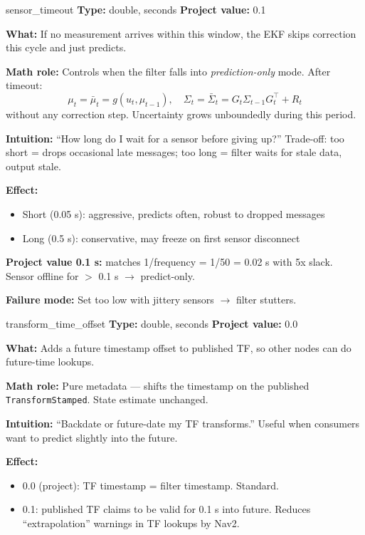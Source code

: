 \documentclass[11pt,a4paper]{article}
\begin{document}
\begin{paramcard}{sensor\_timeout}
\textbf{Type:} double, seconds \quad \textbf{Project value:} 0.1

\textbf{What:} If no measurement arrives within this window, the EKF skips correction this cycle and just predicts.

\textbf{Math role:} Controls when the filter falls into \emph{prediction-only} mode. After timeout:
\[
\mu_t = \bar{\mu}_t = g(u_t, \mu_{t-1}), \quad \Sigma_t = \bar{\Sigma}_t = G_t \Sigma_{t-1} G_t^\top + R_t
\]
without any correction step. Uncertainty grows unboundedly during this period.

\textbf{Intuition:} ``How long do I wait for a sensor before giving up?'' Trade-off: too short = drops occasional late messages; too long = filter waits for stale data, output stale.

\textbf{Effect:}
\begin{itemize}
\item Short (0.05 s): aggressive, predicts often, robust to dropped messages
\item Long (0.5 s): conservative, may freeze on first sensor disconnect
\end{itemize}

\textbf{Project value 0.1 s:} matches 1/frequency = 1/50 = 0.02 s with 5x slack. Sensor offline for $>$ 0.1 s $\to$ predict-only.

\textbf{Failure mode:} Set too low with jittery sensors $\to$ filter stutters.
\end{paramcard}

\begin{paramcard}{transform\_time\_offset}
\textbf{Type:} double, seconds \quad \textbf{Project value:} 0.0

\textbf{What:} Adds a future timestamp offset to published TF, so other nodes can do future-time lookups.

\textbf{Math role:} Pure metadata --- shifts the timestamp on the published \texttt{TransformStamped}. State estimate unchanged.

\textbf{Intuition:} ``Backdate or future-date my TF transforms.'' Useful when consumers want to predict slightly into the future.

\textbf{Effect:}
\begin{itemize}
\item 0.0 (project): TF timestamp = filter timestamp. Standard.
\item 0.1: published TF claims to be valid for 0.1 s into future. Reduces ``extrapolation'' warnings in TF lookups by Nav2.
\end{itemize}
\end{paramcard}
\end{document}
